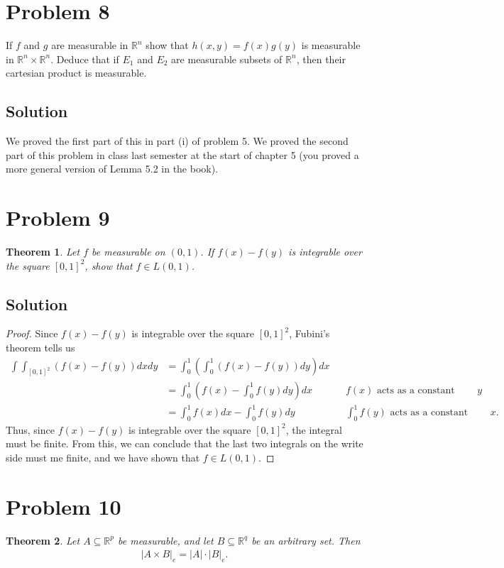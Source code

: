 \documentclass[10pt,a4paper]{article}
\theoremstyle{theorem}
\newtheorem{theorem}{Theorem}
\theoremstyle{definition}
\begin{document}
\section*{Problem 8}
If $f$ and $g$ are measurable in $\mathbb{R}^n$ show that $h(x, y) = f(x)g(y)$ is measurable in $\mathbb{R}^n \times \mathbb{R}^n$. Deduce that if $E_1$ and $E_2$ are measurable subsets of $\mathbb{R}^n$, then their cartesian product is measurable.

\subsection*{Solution}
We proved the first part of this in part (i) of problem 5. We proved the second part of this problem in class last semester at the start of chapter 5 (you proved a more general version of Lemma 5.2 in the book).

\section*{Problem 9}
\begin{theorem}
Let $f$ be measurable on $(0, 1)$. If $f(x) - f(y)$ is integrable over the square $[0, 1]^2$, show that $f \in L(0, 1)$.
\end{theorem}

\subsection*{Solution}
\begin{proof}
Since $f(x) - f(y)$ is integrable over the square $[0, 1]^2$, Fubini's theorem tells us
\begin{align*}
\int \int_{[0, 1]^2} (f(x) - f(y)) dx dy &= \int_0^1 \left( \int_0^1 (f(x) - f(y)) dy \right) dx\\
&= \int_0^1 \left(f(x) - \int_0^1 f(y) dy \right) dx &&f(x) \text{ acts as a constant when integrating over }y\\
&= \int_0^1 f(x) dx - \int_0^1 f(y) dy &&\int_0^1 f(y) \text{ acts as a constant when integrating over }x.
\end{align*}
Thus, since $f(x) - f(y)$ is integrable over the square $[0, 1]^2$, the integral must be finite. From this, we can conclude that the last two integrals on the write side must me finite, and we have shown that $f \in L(0, 1)$.
\end{proof}

\section*{Problem 10}
\begin{theorem}
Let $A \subseteq \mathbb{R}^p$ be measurable, and let $B \subseteq \mathbb{R}^q$ be an arbitrary set. Then
\begin{align*}
|A \times B|_e = |A| \cdot |B|_e.
\end{align*}
\end{theorem}
\end{document}
